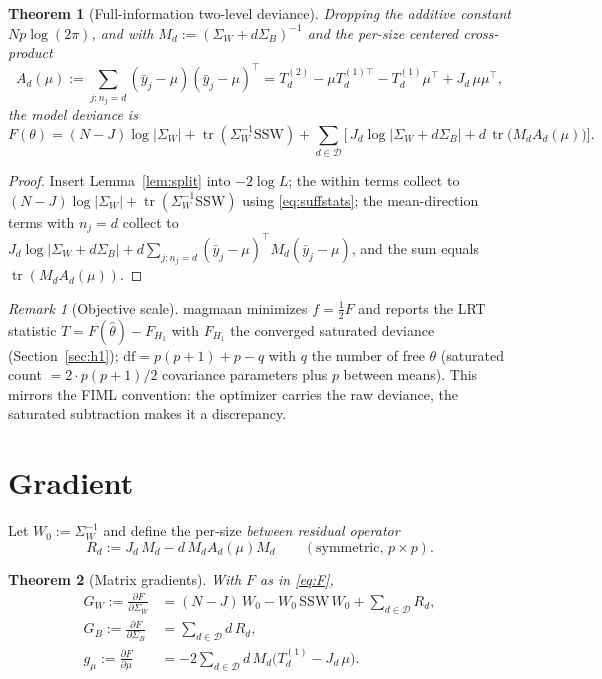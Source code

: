 \documentclass[11pt]{article}
\newcommand{\tr}{\operatorname{tr}}
\newcommand{\Sw}{\Sigma_W}
\newcommand{\Sb}{\Sigma_B}
\newcommand{\Md}{M_d}
\newcommand{\Rd}{R_d}
\newcommand{\SSW}{\mathrm{SSW}}
\theoremstyle{plain}
\newtheorem{theorem}{Theorem}
\theoremstyle{remark}
\newtheorem*{remark}{Remark}
\begin{document}
\begin{theorem}[Full-information two-level deviance]
\label{thm:F}
Dropping the additive constant $Np\log(2\pi)$, and with
$\Md:=(\Sw+d\Sb)^{-1}$ and the per-size centered cross-product
\[
A_d(\mu):=\!\!\sum_{j:n_j=d}\!\!(\bar y_j-\mu)(\bar y_j-\mu)^\top
=T^{(2)}_d-\mu T^{(1)\top}_d-T^{(1)}_d\mu^\top+J_d\,\mu\mu^\top,
\]
the model deviance is
\begin{equation}
\label{eq:F}
F(\theta)=(N-J)\log|\Sw|+\tr(\Sw^{-1}\SSW)
+\sum_{d\in\mathcal D}\Big[\,J_d\log|\Sw+d\Sb|+d\,\tr\!\big(\Md A_d(\mu)\big)\Big].
\end{equation}
\end{theorem}

\begin{proof}
Insert Lemma~\ref{lem:split} into $-2\log L$; the within terms collect to
$(N-J)\log|\Sw|+\tr(\Sw^{-1}\SSW)$ using \eqref{eq:suffstats}; the
mean-direction terms with $n_j=d$ collect to
$J_d\log|\Sw+d\Sb|+d\sum_{j:n_j=d}(\bar y_j-\mu)^\top \Md(\bar y_j-\mu)$, and the
sum equals $\tr(\Md A_d(\mu))$.
\end{proof}

\begin{remark}[Objective scale]
magmaan minimizes $f=\tfrac12 F$ and reports the LRT statistic
$T=F(\hat\theta)-F_{H_1}$ with $F_{H_1}$ the converged saturated deviance
(Section~\ref{sec:h1}); $\mathrm{df}=p(p{+}1)+p-q$ with $q$ the number of free
$\theta$ (saturated count $=2\cdot p(p{+}1)/2$ covariance parameters plus $p$
between means). This mirrors the FIML convention: the optimizer carries the raw
deviance, the saturated subtraction makes it a discrepancy.
\end{remark}

\section{Gradient}

Let $W_0:=\Sw^{-1}$ and define the per-size \emph{between residual operator}
\begin{equation}
\label{eq:Rd}
\Rd:=J_d\,\Md-d\,\Md A_d(\mu)\Md\qquad(\text{symmetric, }p\times p).
\end{equation}

\begin{theorem}[Matrix gradients]
\label{thm:grad}
With $F$ as in \eqref{eq:F},
\begin{align}
G_W:=\frac{\partial F}{\partial \Sw}
 &=(N-J)\,W_0-W_0\,\SSW\,W_0+\sum_{d\in\mathcal D}\Rd,
 \label{eq:GW}\\
G_B:=\frac{\partial F}{\partial \Sb}
 &=\sum_{d\in\mathcal D} d\,\Rd,
 \label{eq:GB}\\
g_\mu:=\frac{\partial F}{\partial \mu}
 &=-2\sum_{d\in\mathcal D} d\,\Md\big(T^{(1)}_d-J_d\,\mu\big).
 \label{eq:gmu}
\end{align}
\end{theorem}
\end{document}

